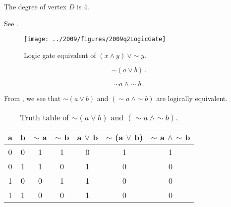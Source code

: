 \begin{subquestions}
\subquestion

The degree of vertex $D$ is $4$.


\subquestion

See .

\begin{figure}
	\begin{center}
		\texttt{[image: ../2009/figures/2009q2LogicGate]}
		\caption{\label{2009:q2:fig:LogicGates} Logic gate equivalent of $(x \land y) ~\lor \sim y$.}
	\end{center}
\end{figure}


\subquestion

\begin{subsubquestions}
	

\subsubquestion

\begin{equation}
	\sim (a \lor b)\,.
\end{equation}


\subsubquestion

\begin{equation}
	\sim a ~\land \sim b\,.
\end{equation}


\subsubquestion

From , we see that $\sim (a \lor b)$ and $(\sim a ~\land \sim b)$ are logically equivalent.

\begin{table}[ht]
	\centering
	\begin{tabular}{|c|c|c|c|c|c|c|}
		\hline
		a & b & $\sim$ a & $\sim$ b & a $\lor$ b & $\sim$ (a $\lor$ b) & $\sim$ a $\land$ $\sim$ b \\
		\hline
		0 & 0 & 1 & 1 & 0 & 1 & 1 \\
		0 & 1 & 1 & 0 & 1 & 0 & 0 \\
		1 & 0 & 0 & 1 & 1 & 0 & 0 \\
		1 & 1 & 0 & 0 & 1 & 0 & 0 \\
		\hline
	\end{tabular}
	\caption{\label{2009:q2:tab:TruthTab2} Truth table of $\sim (a \lor b)$ and $(\sim a ~\land \sim b)$.}
\end{table}


\end{subsubquestions}
\end{subquestions}
